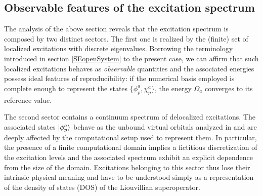 \documentclass[reprint,aps,prb]{revtex4-1}
\begin{document}
\subsection{Observable features of the excitation spectrum}

The analysis of the above section reveals that the excitation spectrum is composed by two distinct sectors. 
The first one is realized by the (finite) set of localized excitations with discrete eigenvalues. 
Borrowing the terminology introduced in section \ref{SEopenSystem} to the present case, we can affirm that such localized excitations behaves as
\emph{observable} quantities and the associated energies possess ideal features of reproducibility:
if the numerical basis employed is complete enough to
represent the states $\{\phi_p^a,\chi_p^a\}$, the energy $\Omega_a$ 
converges to its reference value.

The second sector contains a continuum spectrum of delocalized excitations. The associated states $\ket{\phi_p^a}$ behave as the unbound virtual orbitals analyzed in \cite{boffi2016} 
and are deeply affected by the computational setup used to represent them. In particular, the presence of a finite computational domain implies a fictitious discretization of the excitation levels and 
the associated spectrum exhibit an explicit dependence from the size of the domain. 
Excitations belonging to this sector thus lose their intrinsic physical meaning and have to be understood simply as
a representation of the density of states (DOS) of the Liouvillian superoperator.
\end{document}
